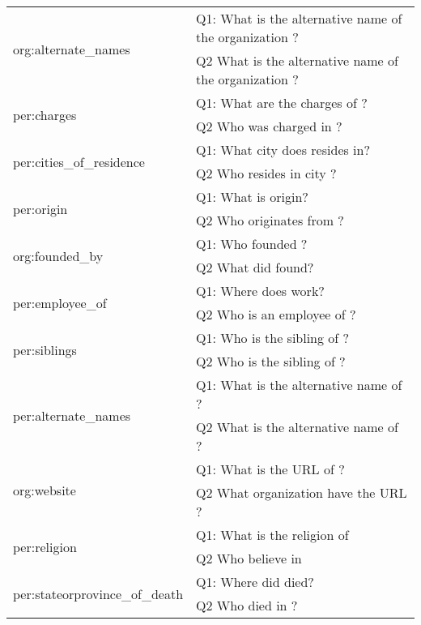 \documentclass[11pt]{article}
\begin{document}
\begin{table*}[h]
{\begin{tabular}{|l|l|}
\multirow{2}{*}{ org:alternate\_names } & Q1:  What is the alternative name of the organization ?                 \\
               & Q2 What is the alternative name of the organization ?                 \\ \hline
\multirow{2}{*}{ per:charges } & Q1:  What are the charges of ?                 \\
               & Q2 Who was charged in ?                 \\ \hline
\multirow{2}{*}{ per:cities\_of\_residence } & Q1:  What city does  resides in?                 \\
               & Q2 Who resides in city ?                 \\ \hline
\multirow{2}{*}{ per:origin } & Q1:  What is  origin?                 \\
               & Q2 Who originates from ?                 \\ \hline
\multirow{2}{*}{ org:founded\_by } & Q1:  Who founded ?                 \\
               & Q2 What did  found?                 \\ \hline
\multirow{2}{*}{ per:employee\_of } & Q1:  Where does  work?                 \\
               & Q2 Who is an employee of ?                 \\ \hline
\multirow{2}{*}{ per:siblings } & Q1:  Who is the sibling of ?                 \\
               & Q2 Who is the sibling of ?                 \\ \hline
\multirow{2}{*}{ per:alternate\_names } & Q1:  What is the alternative name of ?                 \\
               & Q2 What is the alternative name of ?                 \\ \hline
\multirow{2}{*}{ org:website } & Q1:  What is the URL of ?                 \\
               & Q2 What organization have the URL ?                 \\ \hline
\multirow{2}{*}{ per:religion } & Q1:  What is the religion of                  \\
               & Q2 Who believe in                  \\ \hline
\multirow{2}{*}{ per:stateorprovince\_of\_death } & Q1:  Where did  died?                 \\
               & Q2 Who died in ?                 \\ \hline

\end{tabular}}
\end{table*}
\end{document}
